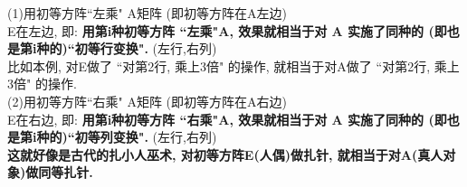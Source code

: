 \documentclass[UTF8]{ctexart}
\begin{document}
\begin{myEnvSample}
(1)用初等方阵``左乘" A矩阵 (即初等方阵在A左边)\\
E在左边, 即: \textbf{用第i种初等方阵 ``左乘"A, 效果就相当于对 A 实施了同种的  (即也是第i种的)``初等行变换".} (左行,右列) \\
比如本例, 对E做了 ``对第2行, 乘上3倍" 的操作, 就相当于对A做了 ``对第2行, 乘上3倍" 的操作.\\

(2)用初等方阵``右乘" A矩阵 (即初等方阵在A右边)\\
E在右边, 即: \textbf{用第i种初等方阵 ``右乘"A, 效果就相当于对 A 实施了同种的 (即也是第i种的)``初等列变换".} (左行,右列)\\

\textbf{这就好像是古代的扎小人巫术, 对初等方阵E(人偶)做扎针, 就相当于对A(真人对象)做同等扎针.}
\end{myEnvSample}





\end{document}
